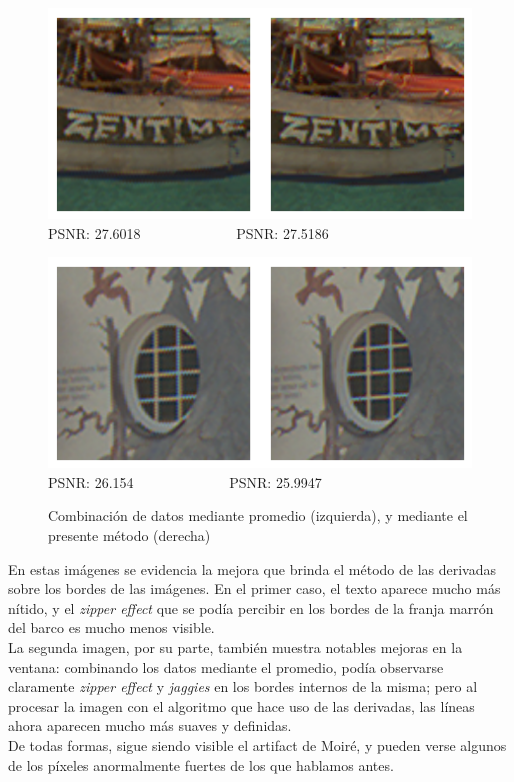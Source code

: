 \documentclass[a4paper]{article}
\begin{document}
\begin{figure}[h!]
	\begin{center}
	    \includegraphics[scale=0.47]{imagenes/Splines/RecortesSplines/pesos1y0/barco2.png}\\
	    PSNR: 27.6018 \ \ \ \ \ \ \ \ \ \ \ \ \ PSNR: 27.5186
	\end{center}
	\begin{center}
	    \includegraphics[scale=0.47]{imagenes/Splines/RecortesSplines/pesos1y0/ventana.png}\\
	    PSNR: 26.154 \ \ \ \ \ \ \ \ \ \ \ \ \ PSNR: 25.9947
	\end{center}
	\caption{Combinación de datos mediante promedio (izquierda), y mediante el presente método (derecha)}
	\label{splines3}
\end{figure}

En estas imágenes se evidencia la mejora que brinda el método de las derivadas sobre los bordes de las imágenes. En el primer caso, el texto aparece mucho más nítido, y el \textit{zipper effect} que se podía percibir en los bordes de la franja marrón del barco es mucho menos visible.\\
\indent La segunda imagen, por su parte, también muestra notables mejoras en la ventana: combinando los datos mediante el promedio, podía observarse claramente \textit{zipper effect} y \textit{jaggies} en los bordes internos de la misma; pero al procesar la imagen con el algoritmo que hace uso de las derivadas, las líneas ahora aparecen mucho más suaves y definidas. \\
De todas formas, sigue siendo visible el artifact de Moiré, y pueden verse algunos de los píxeles anormalmente fuertes de los que hablamos antes. \\
\end{document}
